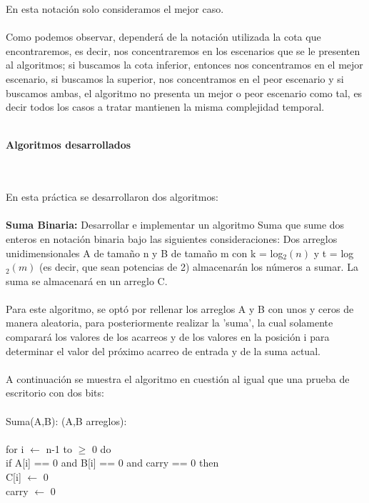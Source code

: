 \documentclass[12pt,twoside]{article}
\begin{document}
En esta notaci\'on solo consideramos el mejor caso.\\\\
Como podemos observar, depender\'a de la notaci\'on utilizada la cota que encontraremos, es decir, nos concentraremos en los escenarios que se le presenten al algoritmos; si buscamos la cota inferior, entonces nos concentramos en el mejor escenario, si buscamos la superior, nos concentramos en el peor escenario y si buscamos ambas, el algoritmo no presenta un mejor o peor escenario como tal, es decir todos los casos a tratar mantienen la misma complejidad temporal.\\\\
\centerline{\bf Algoritmos desarrollados}\\\\
En esta pr\'actica se desarrollaron dos algoritmos:\\\\
{\bf Suma Binaria:} Desarrollar e implementar un algoritmo Suma que sume dos enteros en notaci\'on binaria bajo las siguientes consideraciones: Dos arreglos unidimensionales A de tama\~{n}o n y B de tama\~{n}o m con k = log$_2(n)$ y t = log$_2(m)$ (es decir, que sean potencias de 2) almacenar\'an los n\'umeros a sumar. La suma se almacenar\'a en un arreglo C.\\\\
Para este algoritmo, se opt\'o por rellenar los arreglos A y B con unos y ceros de manera aleatoria, para posteriormente realizar la 'suma', la cual solamente comparar\'a los valores de los acarreos y de los valores en la posici\'on i para determinar el valor del pr\'oximo acarreo de entrada y de la suma actual.\\\\
A continuaci\'on se muestra el algoritmo en cuesti\'on al igual que una prueba de escritorio con dos bits:\\\\
Suma(A,B): (A,B arreglos):\\\\
\hspace*{1cm}for i $\leftarrow$ n-1 to $\geq$ 0 do\\
\hspace*{2cm}if A[i] == 0 and B[i] == 0 and carry == 0 then\\
\hspace*{3cm}C[i] $\leftarrow$ 0\\
\hspace*{3cm}carry $\leftarrow$ 0\\
\end{document}
